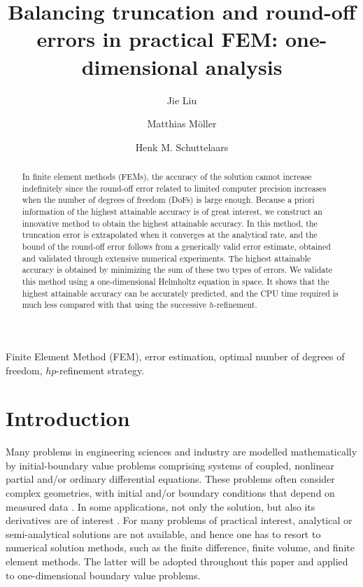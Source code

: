 \documentclass[review,3p]{elsarticle}
\begin{document}
\begin{frontmatter}

\title{Balancing truncation and round-off errors in practical FEM: one-dimensional analysis}

 \author[1]{Jie Liu}
 \author[1]{Matthias M\"oller}
 \author[1]{Henk M. Schuttelaars}
 
 \address[1]{Delft Institute of Applied Mathematics\\ Delft University of Technology\\ Van Mourik Broekmanweg 6, 2628 XE Delft, The Netherlands}

\begin{abstract}
In finite element methods (FEMs), the accuracy of the solution cannot increase indefinitely since the round-off error related to limited computer precision increases when the number of degrees of freedom (DoFs) is large enough. Because a priori information of the highest attainable accuracy is of great interest, we construct an innovative method to obtain the highest attainable accuracy.
In this method, the truncation error is extrapolated when it converges at the analytical rate, and the bound of the round-off error follows from a generically valid error estimate, obtained and validated through extensive numerical experiments. The highest attainable accuracy is obtained by minimizing the sum of these two types of errors.
We validate this method using a one-dimensional Helmholtz equation in space. 
It shows that the highest attainable accuracy can be accurately predicted, and the CPU time required is much less compared with that using the successive $h$-refinement. 
\end{abstract}

\begin{keyword}
Finite Element Method (FEM), error estimation, optimal number of degrees of freedom, $hp$-refinement strategy.
\end{keyword}

\end{frontmatter}

\section{Introduction}

Many problems in engineering sciences and industry are modelled mathematically by initial-boundary value problems comprising systems of coupled, nonlinear partial and/or ordinary differential equations. These problems often consider complex geometries, with initial and/or boundary conditions that depend on measured data \cite{Kumar2016}. 
In some applications, not only the solution, but also its derivatives are of interest \cite{Kumar2016,carey1982derivative}.
For many problems of practical interest, analytical or semi-analytical solutions are not available, and hence one has to resort to numerical solution methods, such as the finite difference, finite volume, and finite element methods. The latter will be adopted throughout this paper and applied to one-dimensional boundary value problems.
\end{document}
